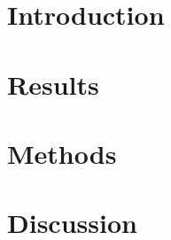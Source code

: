 \documentclass{ws-procs11x85}
\begin{document}
\begin{multicols}{2}

\section{Introduction}\label{aba:intro}


\section{Results}\label{aba:results}


\section{Methods}\label{aba:methods}


\section{Discussion}\label{aba:discussion}


\end{multicols}



\end{document}
